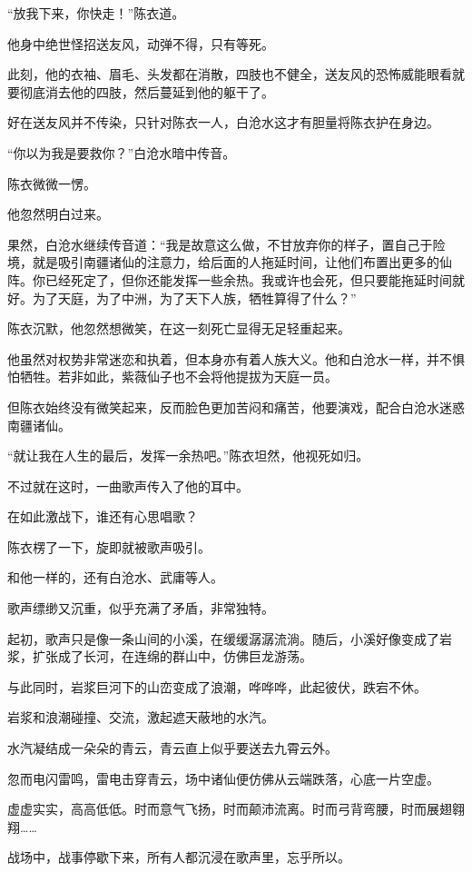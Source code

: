 \begin{this_body}
“放我下来，你快走！”陈衣道。

他身中绝世怪招送友风，动弹不得，只有等死。

此刻，他的衣袖、眉毛、头发都在消散，四肢也不健全，送友风的恐怖威能眼看就要彻底消去他的四肢，然后蔓延到他的躯干了。

好在送友风并不传染，只针对陈衣一人，白沧水这才有胆量将陈衣护在身边。

“你以为我是要救你？”白沧水暗中传音。

陈衣微微一愣。

他忽然明白过来。

果然，白沧水继续传音道：“我是故意这么做，不甘放弃你的样子，置自己于险境，就是吸引南疆诸仙的注意力，给后面的人拖延时间，让他们布置出更多的仙阵。你已经死定了，但你还能发挥一些余热。我或许也会死，但只要能拖延时间就好。为了天庭，为了中洲，为了天下人族，牺牲算得了什么？”

陈衣沉默，他忽然想微笑，在这一刻死亡显得无足轻重起来。

他虽然对权势非常迷恋和执着，但本身亦有着人族大义。他和白沧水一样，并不惧怕牺牲。若非如此，紫薇仙子也不会将他提拔为天庭一员。

但陈衣始终没有微笑起来，反而脸色更加苦闷和痛苦，他要演戏，配合白沧水迷惑南疆诸仙。

“就让我在人生的最后，发挥一余热吧。”陈衣坦然，他视死如归。

不过就在这时，一曲歌声传入了他的耳中。

在如此激战下，谁还有心思唱歌？

陈衣楞了一下，旋即就被歌声吸引。

和他一样的，还有白沧水、武庸等人。

歌声缥缈又沉重，似乎充满了矛盾，非常独特。

起初，歌声只是像一条山间的小溪，在缓缓潺潺流淌。随后，小溪好像变成了岩浆，扩张成了长河，在连绵的群山中，仿佛巨龙游荡。

与此同时，岩浆巨河下的山峦变成了浪潮，哗哗哗，此起彼伏，跌宕不休。

岩浆和浪潮碰撞、交流，激起遮天蔽地的水汽。

水汽凝结成一朵朵的青云，青云直上似乎要送去九霄云外。

忽而电闪雷鸣，雷电击穿青云，场中诸仙便仿佛从云端跌落，心底一片空虚。

虚虚实实，高高低低。时而意气飞扬，时而颠沛流离。时而弓背弯腰，时而展翅翱翔……

战场中，战事停歇下来，所有人都沉浸在歌声里，忘乎所以。


\end{this_body}
